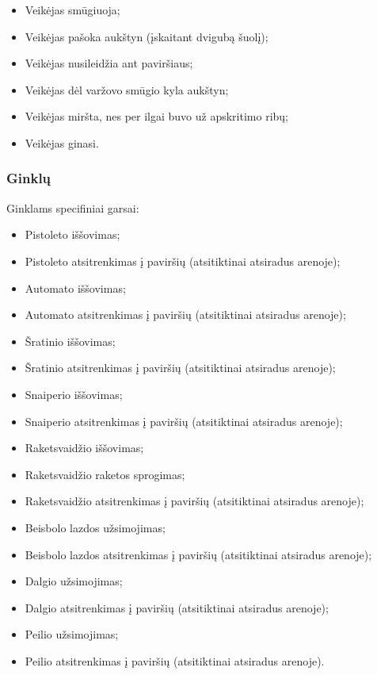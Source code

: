 \documentclass{VUMIFPSkursinis}
\begin{document}
\begin{itemize}
    \item Veikėjas smūgiuoja;
    \item Veikėjas pašoka aukštyn (įskaitant dvigubą šuolį);
    \item Veikėjas nusileidžia ant paviršiaus;
    \item Veikėjas dėl varžovo smūgio kyla aukštyn;
    \item Veikėjas miršta, nes per ilgai buvo už apskritimo ribų;
    \item Veikėjas ginasi.
\end{itemize}

\subsubsection{Ginklų}
Ginklams specifiniai garsai:

\begin{itemize}
    \item Pistoleto iššovimas;
    \item Pistoleto atsitrenkimas į paviršių (atsitiktinai atsiradus arenoje);
    \item Automato iššovimas;
    \item Automato atsitrenkimas į paviršių (atsitiktinai atsiradus arenoje);
    \item Šratinio iššovimas;
    \item Šratinio atsitrenkimas į paviršių (atsitiktinai atsiradus arenoje);
    \item Snaiperio iššovimas;
    \item Snaiperio atsitrenkimas į paviršių (atsitiktinai atsiradus arenoje);
    \item Raketsvaidžio iššovimas;
    \item Raketsvaidžio raketos sprogimas;
    \item Raketsvaidžio atsitrenkimas į paviršių (atsitiktinai atsiradus arenoje);
    \item Beisbolo lazdos užsimojimas;
    \item Beisbolo lazdos atsitrenkimas į paviršių (atsitiktinai atsiradus arenoje);
    \item Dalgio užsimojimas;
    \item Dalgio atsitrenkimas į paviršių (atsitiktinai atsiradus arenoje);
    \item Peilio užsimojimas;
    \item Peilio atsitrenkimas į paviršių (atsitiktinai atsiradus arenoje).
\end{itemize}
\end{document}
